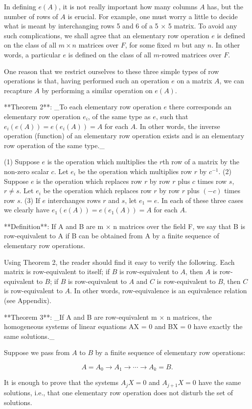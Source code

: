 In defining \(e(A)\), it is not really important how many columns \(A\) has, but the number of rows of \(A\) is erucial. For example, one must worry a little to decide what is meant by interchanging rows 5 and 6 of a 5 \(\times\) 5 matrix. To avoid any such complications, we shall agree that an elementary row operation \(e\) is defined on the class of all \(m\times n\) matrices over \(F\), for some fixed \(m\) but any \(n\). In other words, a particular \(e\) is defined on the class of all \(m\)-rowed matrices over \(F\).

One reason that we restrict ourselves to these three simple types of row operations is that, having performed such an operation \(e\) on a matrix \(A\), we can recapture \(A\) by performing a similar operation on \(e(A)\).

**Theorem 2**: _To each elementary row operation \(e\) there corresponds an elementary row operation \(e_{i}\), of the same type as \(e\), such that \(e_{i}(e(A))=e(e_{i}(A))=A\) for each \(A\). In other words, the inverse operation (function) of an elementary row operation exists and is an elementary row operation of the same type._

(1) Suppose \(e\) is the operation which multiplies the \(r\)th row of a matrix by the non-zero scalar \(c\). Let \(e_{i}\) be the operation which multiplies row \(r\) by \(c^{-1}\). (2) Suppose \(e\) is the operation which replaces row \(r\) by row \(r\) plus \(c\) times row \(s\), \(r\neq s\). Let \(e_{i}\) be the operation which replaces row \(r\) by row \(r\) plus \((-c)\) times row \(s\). (3) If \(e\) interchanges rows \(r\) and \(s\), let \(e_{1}=e\). In each of these three cases we clearly have \(e_{1}(e(A))=e(e_{1}(A))=A\) for each \(A\).

**Definition**: If A and B are m \(\times\) n matrices over the field F, we say that B is row-equivalent to A if B can be obtained from A by a finite sequence of elementary row operations.

Using Theorem 2, the reader should find it easy to verify the following. Each matrix is row-equivalent to itself; if \(B\) is row-equivalent to \(A\), then \(A\) is row-equivalent to \(B\); if \(B\) is row-equivalent to \(A\) and \(C\) is row-equivalent to \(B\), then \(C\) is row-equivalent to \(A\). In other words, row-equivalence is an equivalence relation (see Appendix).

**Theorem 3**: _If A and B are row-equivalent m \(\times\) n matrices, the homogeneous systems of linear equations AX = 0 and BX = 0 have exactly the same solutions._

Suppose we pass from \(A\) to \(B\) by a finite sequence of elementary row operations:

\[A=A_{0}\to A_{1}\to\cdots\to A_{k}=B.\]

It is enough to prove that the systems \(A_{j}X=0\) and \(A_{j+1}X=0\) have the same solutions, i.e., that one elementary row operation does not disturb the set of solutions.

 